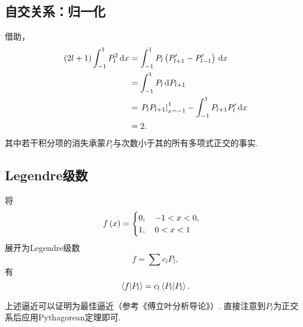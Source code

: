 \documentclass[UTF-8]{ctexart}
\begin{document}
  \subsection{自交关系：归一化}
  借助，
  \begin{align*}
    \left(2l+1\right)\int_{-1}^{1} P_l^2 \, \mathrm{d} x &= \int_{-1}^{1} P_l\left(P'_{l+1}-P'_{l-1}\right) \, \mathrm{d} x \\
    &= \int_{-1}^{1} P_l \, \mathrm{d} P_{l+1} \\
    &= \left.P_lP_{l+1}\right\vert_{x=-1}^{1} - \int_{-1}^{1} P_{l+1}P'_l \, \mathrm{d} x \\
    &= 2.
  \end{align*}
  其中若干积分项的消失承蒙$P_l$与次数小于其的所有多项式正交的事实.
  \subsection{Legendre级数}
  \begin{ex}
    将
    \[ 
       f\left(x\right) = \begin{cases}
       0, \quad -1<x<0,\\
       1, \quad 0<x<1
       \end{cases}
    \]
    展开为Legendre级数
    \[ f=\sum c_l P_l, \]
    有
    \[ \bra{f}\ket{P_l} = c_l\bra{P_l}\ket{P_l}. \]
  \end{ex}
  上述逼近可以证明为最佳逼近（参考《傅立叶分析导论》）. 直接注意到$P_l$为正交系后应用Pythagorean定理即可.
\end{document}
